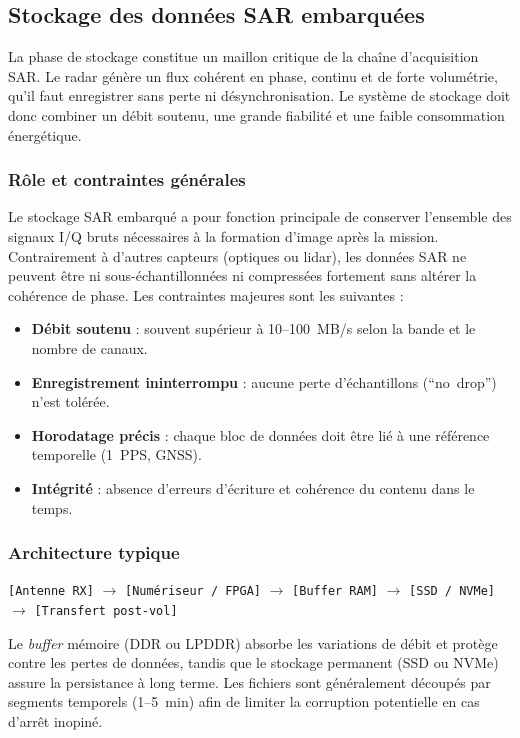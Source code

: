 
\subsection{Stockage des données SAR embarquées}
La phase de stockage constitue un maillon critique de la chaîne d'acquisition SAR. Le radar génère un flux cohérent en phase, continu et de forte volumétrie, qu’il faut enregistrer sans perte ni désynchronisation. Le système de stockage doit donc combiner un débit soutenu, une grande fiabilité et une faible consommation énergétique.

\subsubsection{Rôle et contraintes générales}

Le stockage SAR embarqué a pour fonction principale de conserver l’ensemble des signaux I/Q bruts nécessaires à la formation d’image après la mission. Contrairement à d’autres capteurs (optiques ou lidar), les données SAR ne peuvent être ni sous-échantillonnées ni compressées fortement sans altérer la cohérence de phase. Les contraintes majeures sont les suivantes :
\begin{itemize}
  \item \textbf{Débit soutenu} : souvent supérieur à 10--100~MB/s selon la bande et le nombre de canaux.
  \item \textbf{Enregistrement ininterrompu} : aucune perte d’échantillons (``no~drop'') n’est tolérée.
  \item \textbf{Horodatage précis} : chaque bloc de données doit être lié à une référence temporelle (1~PPS, GNSS).
  \item \textbf{Intégrité} : absence d’erreurs d’écriture et cohérence du contenu dans le temps.
\end{itemize}

\subsubsection{Architecture typique}

\begin{center}
\texttt{[Antenne RX]} $\rightarrow$ \texttt{[Numériseur / FPGA]} $\rightarrow$ \texttt{[Buffer RAM]} $\rightarrow$ \texttt{[SSD / NVMe]} $\rightarrow$ \texttt{[Transfert post-vol]}
\end{center}

Le \textit{buffer} mémoire (DDR ou LPDDR) absorbe les variations de débit et protège contre les pertes de données, tandis que le stockage permanent (SSD ou NVMe) assure la persistance à long terme. Les fichiers sont généralement découpés par segments temporels (1--5~min) afin de limiter la corruption potentielle en cas d’arrêt inopiné.

